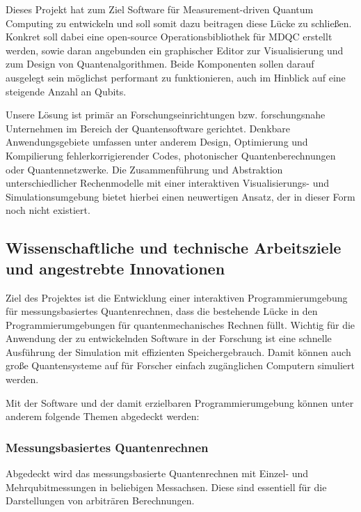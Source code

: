 \documentclass[11pt, a4paper]{article}
\newcommand{\instruction}[1]{{}}
\begin{document}
Dieses Projekt hat zum Ziel Software für Measurement-driven Quantum
Computing zu entwickeln und soll somit dazu beitragen diese Lücke zu
schließen.  Konkret soll dabei eine open-source Operationsbibliothek
für MDQC erstellt werden, sowie daran angebunden ein graphischer
Editor zur Visualisierung und zum Design von Quantenalgorithmen. Beide
Komponenten sollen darauf ausgelegt sein möglichst performant zu
funktionieren, auch im Hinblick auf eine steigende Anzahl an Qubits.

Unsere Lösung ist primär an Forschungseinrichtungen
bzw. forschungsnahe Unternehmen im Bereich der Quantensoftware
gerichtet. Denkbare Anwendungsgebiete umfassen unter anderem Design,
Optimierung und Kompilierung fehlerkorrigierender Codes, photonischer
Quantenberechnungen oder Quantennetzwerke.  Die Zusammenführung und
Abstraktion unterschiedlicher Rechenmodelle mit einer interaktiven
Visualisierungs- und Simulationsumgebung bietet hierbei einen
neuwertigen Ansatz, der in dieser Form noch nicht existiert.



\subsection{Wissenschaftliche und technische Arbeitsziele und angestrebte Innovationen}

\instruction{Nachweis durch Demonstrator mit quantitativen
  Zielparametern.}

Ziel des Projektes ist die Entwicklung einer interaktiven
Programmierumgebung für messungsbasiertes Quantenrechnen, dass die
bestehende Lücke in den Programmierumgebungen für quantenmechanisches
Rechnen füllt. Wichtig für die Anwendung der zu entwickelnden Software
in der Forschung ist eine schnelle Ausführung der Simulation mit
effizienten Speichergebrauch. Damit können auch große Quantensysteme
auf für Forscher einfach zugänglichen Computern simuliert werden.

Mit der Software und der damit erzielbaren Programmierumgebung können
unter anderem folgende Themen abgedeckt werden:

\subsubsection{Messungsbasiertes Quantenrechnen}

Abgedeckt wird das messungsbasierte Quantenrechnen mit Einzel- und
Mehrqubitmessungen in beliebigen Messachsen. Diese sind essentiell für
die Darstellungen von arbiträren Berechnungen.
\end{document}
